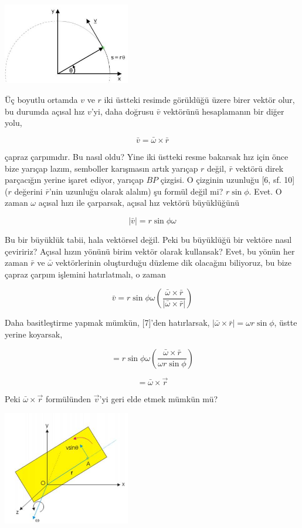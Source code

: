\documentclass[12pt,fleqn]{article}\usepackage{../../common}
\begin{document}
\includegraphics[width=15em]{phy_005_basics_02_15.jpg}

Üç boyutlu ortamda $v$ ve $r$ iki üstteki resimde görüldüğü üzere birer vektör
olur, bu durumda açısal hız $v$'yi, daha doğrusu $\bar{v}$ vektörünü
hesaplamanın bir diğer yolu,

$$
\bar{v} = \bar{\omega} \times \bar{r}
$$

çapraz çarpımıdır. Bu nasıl oldu? Yine iki üstteki resme bakarsak hız için önce
bize yarıçap lazım, semboller karışmasın artık yarıçap $r$ değil, $\bar{r}$
vektörü direk parçacığın yerine işaret ediyor, yarıçap $BP$ çizgisi. O çizginin
uzunluğu [6, sf. 10] ($r$ değerini $\bar{r}$'nin uzunluğu olarak alalım) şu
formül değil mi? $r\sin\phi$. Evet. O zaman $\omega$ açısal hızı ile çarparsak,
açısal hız vektörü büyüklüğünü

$$
|\bar{v}| = r \sin\phi \omega
$$

Bu bir büyüklük tabii, hala vektörsel değil. Peki bu büyüklüğü bir vektöre nasıl
çeviririz?  Açısal hızın yönünü birim vektör olarak kullansak?  Evet, bu yönün
her zaman $\bar{r}$ ve $\bar{\omega}$ vektörlerinin oluşturduğu düzleme dik
olacağını biliyoruz, bu bize çapraz çarpım işlemini hatırlatmalı, o zaman

$$
\bar{v} = r \sin\phi \omega
\left( \frac{\bar{\omega} \times \bar{r}}{| \bar{\omega} \times \bar{r} |}  \right)
$$

Daha basitleştirme yapmak mümkün, [7]'den hatırlarsak,
$|\bar{\omega} \times \bar{r} | = \omega r \sin\phi$, üstte yerine koyarsak,

$$
 = r \sin\phi \omega
\left( \frac{\bar{\omega} \times \bar{r}}{\omega r \sin\phi}  \right)
$$

$$
 = \bar{\omega} \times \vec{r}
$$

Peki $\bar{\omega} \times \vec{r}$ formülünden $\vec{v}$'yi geri elde etmek mümkün mü?

\includegraphics[width=15em]{phy_005_basics_02_16.jpg}
\end{document}
